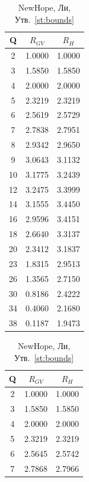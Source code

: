 \newpage
\begin{table}[h]
	\centering
	\begin{minipage}{0.48\textwidth}
		\caption{NewHope, Хэмминг, Утв.~\ref{st:bounds}}
		\centering
		\label{tab:Hope,Ham}
		\begin{tabular}{|c|c|c|}
			\hline Q & $R_{GV}$ & $R_H$ \\ \hline
			2 & 1.0000 & 1.0000 \\ \hline
			3 & 1.5850 & 1.5850 \\ \hline
			4 & 2.0000 & 2.0000 \\ \hline
			5 & 2.3219 & 2.3219 \\ \hline
			6 & 2.5619 & 2.5729 \\ \hline
			7 & 2.7838 & 2.7951 \\ \hline
			8 & 2.9342 & 2.9650 \\ \hline
			9 & 3.0643 & 3.1132 \\ \hline
			10 & 3.1775 & 3.2439 \\ \hline
			12 & 3.2475 & 3.3999 \\ \hline
			14 & 3.1555 & 3.4450 \\ \hline
			16 & 2.9596 & 3.4151 \\ \hline
			18 & 2.6640 & 3.3137 \\ \hline
			20 & 2.3412 & 3.1837 \\ \hline
			23 & 1.8315 & 2.9513 \\ \hline
			26 & 1.3565 & 2.7150 \\ \hline
			30 & 0.8186 & 2.4222 \\ \hline
			34 & 0.4060 & 2.1680 \\ \hline
			38 & 0.1187 & 1.9473 \\ \hline
		\end{tabular}
	\end{minipage}
	\hfill
	\begin{minipage}{0.48\textwidth}
		\caption{NewHope, Ли, Утв.~\ref{st:bounds}}
		\centering
		\label{tab:Hope,Li}
		\begin{tabular}{|c|c|c|}
			\hline Q & $R_{GV}$ & $R_H$ \\ \hline
			2 & 1.0000 & 1.0000 \\ \hline
			3 & 1.5850 & 1.5850 \\ \hline
			4 & 2.0000 & 2.0000 \\ \hline
			5 & 2.3219 & 2.3219 \\ \hline
			6 & 2.5645 & 2.5742 \\ \hline
			7 & 2.7868 & 2.7966 \\ \hline

\end{tabular}
\end{minipage}
\end{table}
